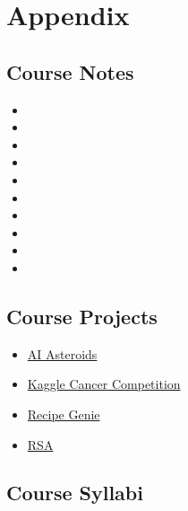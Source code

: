\clearpage

\renewcommand{\ChapTitle}{Appendix}
\renewcommand{\SectionTitle}{Course Notes}

\chapter{\ChapTitle}
\section{\SectionTitle}

\begin{itemize}
    \item \CSPBDataStructCourseNotes
    \item \CSPBCompSysCourseNotes
    \item \CSPBLACourseNotes
    \item \CSPBDiscreteCourseNotes
    \item \CSPBDataSciCourseNotes
    \item \CSPBAlgoCourseNotes
    \item \CSPBPPLCourseNotes
    \item \CSPBAICourseNotes
    \item \CSPBSoftDevCourseNotes
    \item \CSPBCogSciCourseNotes
\end{itemize}

\renewcommand{\SectionTitle}{Course Projects}

\section{\SectionTitle}

\begin{itemize}
    \item \href{https://github.com/QuantumCompiler/AI-Asteroids}{AI Asteroids}
    \item \href{https://github.com/QuantumCompiler/Kaggle-Cancer-Competition}{Kaggle Cancer Competition}
    \item \href{https://github.com/QuantumCompiler/Recipe-Genie}{Recipe Genie}
    \item \href{https://github.com/QuantumCompiler/RSA}{RSA}
\end{itemize}

\renewcommand{\SectionTitle}{Course Syllabi}

\section{\SectionTitle}

